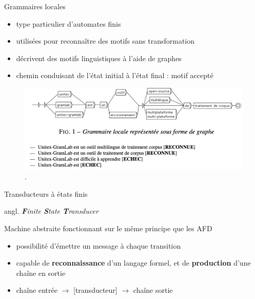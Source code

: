 \documentclass[xetex,xcolor={table,usenames,dvipsnames}]{beamer}
\begin{document}
\begin{frame}{Grammaires locales}

	\begin{itemize}
		\item type particulier d'automates finis
		\item utilisées pour reconnaître des motifs sans transformation
		\item décrivent des motifs linguistiques à l’aide de graphes
		\item chemin conduisant de l’état initial à l’état final : motif accepté
	\end{itemize}
	\begin{figure}[h] %
		\centering
		\includegraphics[width=1\linewidth]{img/grammaires_locales.png}
		\caption{\citep{kyriacopoulou2018unitex}.}
		\label{fig:ling_out_TAL}
	\end{figure}
\end{frame}

\begin{frame}{Transducteurs à états finis}
	
	{\small angl. \textit{\textbf{F}inite \textbf{S}tate \textbf{T}ransducer}}
	
	Machine abstraite fonctionnant sur le même
	principe que les \textsc{AFD}
	
	\begin{itemize}
		\item possibilité d'émettre un message à chaque transition
		\item capable de \textbf{reconnaissance} d'un
		langage formel, et de \textbf{production} d’une
		chaîne en sortie
		\item chaîne entrée $\rightarrow$ [transducteur] $\rightarrow$ chaîne sortie
	\end{itemize}

	
\end{frame}
\end{document}
